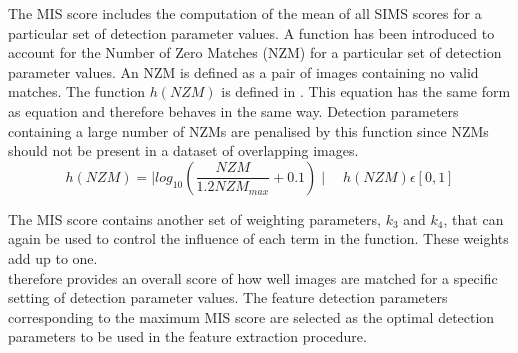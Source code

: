 \documentclass{article}
\begin{document}
The MIS score includes the computation of the mean of all SIMS scores for a particular set of detection parameter values. A function has been introduced to account for the Number of Zero Matches (NZM) for a particular set of detection parameter values. An NZM is defined as a pair of images containing no valid matches. The function $h(NZM)$ is defined in . This equation has the same form as equation  and therefore behaves in the same way. Detection parameters containing a large number of NZMs are penalised by this function since NZMs should not be present in a dataset of overlapping images. \\

\begin{equation}
h(NZM) = \mid log_{10}(\frac{NZM}{1.2 NZM_{max}} + 0.1) \mid \quad h(NZM)\epsilon [0, 1]
\label{eqn:nzm}
\end{equation}

The MIS score contains another set of weighting parameters, $k_3$ and $k_4$, that can again be used to control the influence of each term in the function. These weights add up to one.\\

 therefore provides an overall score of how well images are matched for a specific setting of detection parameter values. The feature detection parameters corresponding to the maximum MIS score are selected as the optimal detection parameters to be used in the feature extraction procedure.\\

\end{document}
